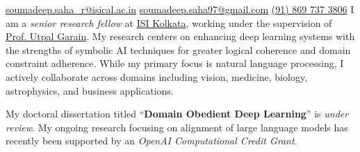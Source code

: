 \documentclass[10pt,a4paper]{article}
\begin{document}
\sloppy


\nobreakvspace{0.3em}
\noindent
\href{mailto:soumadeep.saha\_r@isical.ac.in}{\faEnvelope[regular] soumadeep.saha\_r@isical.ac.in}\sbull
\href{mailto:soumadeep.saha97@gmail.com}{\faEnvelope[regular] soumadeep.saha97@gmail.com}\sbull
\href{tel:+918697373806}{\faPhone (\textsmaller{+}91) 869 737 3806}\sbull
\href{https://github.com/espressovi}{\faGithub[regular]}\sbull
\href{https://www.linkedin.com/in/soumadeep-saha-a36a58103/}{\faLinkedin[regular]}\sbull
\href{https://espressovi.github.io}{\faLink}
\spacedhrule{0.6em}{-0.7em}
\vspace{-0.2em}
    I am a \emph{senior research fellow} at
    \href{https://www.isical.ac.in/}{ISI Kolkata}, working under the
    supervision of \href{https://www.isical.ac.in/~utpal}{Prof. Utpal Garain}.
    My research centers on enhancing deep learning systems with the strengths of
    symbolic AI techniques for greater logical coherence and domain constraint
    adherence. While my primary focus is natural language processing, I actively
    collaborate across domains including vision, medicine, biology,
    astrophysics, and business applications.   

    My doctoral dissertation titled ``\textbf{Domain Obedient Deep Learning}''
    is \emph{under review}. My ongoing research focusing on alignment of large
    language models has recently been supported by an \emph{OpenAI Computational
    Credit Grant}.

\spacedhrule{1em}{-0.7em}

\end{document}
